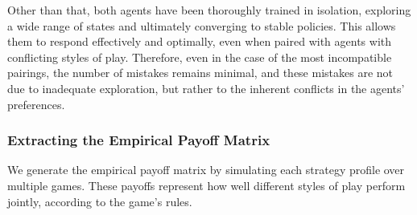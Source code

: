         \noindent
        Other than that, both agents have been thoroughly trained in isolation, exploring a wide range of states and ultimately converging to stable policies. This allows them to respond effectively and optimally, even when paired with agents with conflicting styles of play. Therefore, even in the case of the most incompatible pairings, the number of mistakes remains minimal, and these mistakes are not due to inadequate exploration, but rather to the inherent conflicts in the agents’ preferences. 

    \subsubsection{Extracting the Empirical Payoff Matrix}

        We generate the empirical payoff matrix by simulating each strategy profile over multiple games. These payoffs represent how well different styles of play perform jointly, according to the game’s rules.\tinydouble

